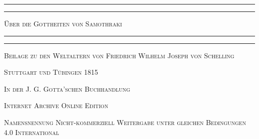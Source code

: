 \documentclass[a4paper, 11pt, oneside]{article}
\begin{document}
\begin{titlepage} %
	\centering %

	
	\rule{\textwidth}{1.6pt}\vspace*{-\baselineskip}\vspace*{2pt} %
	\rule{\textwidth}{0.4pt} %
	
	\vspace{1\baselineskip} %
	
	{\scshape\Huge Über die Gottheiten von Samothraki}
	
	\vspace{1\baselineskip} %

	\rule{\textwidth}{0.4pt}\vspace*{-\baselineskip}\vspace{3.2pt} %
	\rule{\textwidth}{1.6pt} %
	
	\vspace{1\baselineskip} %
	
	
	{\scshape \Large Beilage zu den Weltaltern von Friedrich Wilhelm Joseph von Schelling} %
	
	\vspace*{1\baselineskip} %
	    
        \vspace*{\fill}

	\vspace{1\baselineskip}

	{\small\scshape Stuttgart und Tübingen 1815}
	
	{\small\scshape{In der J. G. Gotta'schen Buchhandlung}}
	
	\vspace{0.5\baselineskip} %

        \scshape Internet Archive Online Edition  %
	
	{\scshape\small Namensnennung Nicht-kommerziell Weitergabe unter gleichen Bedingungen 4.0 International} %
\end{titlepage}
\setlength{\parskip}{1mm plus1mm minus1mm}
\clearpage
\tableofcontents
\clearpage
\end{document}
